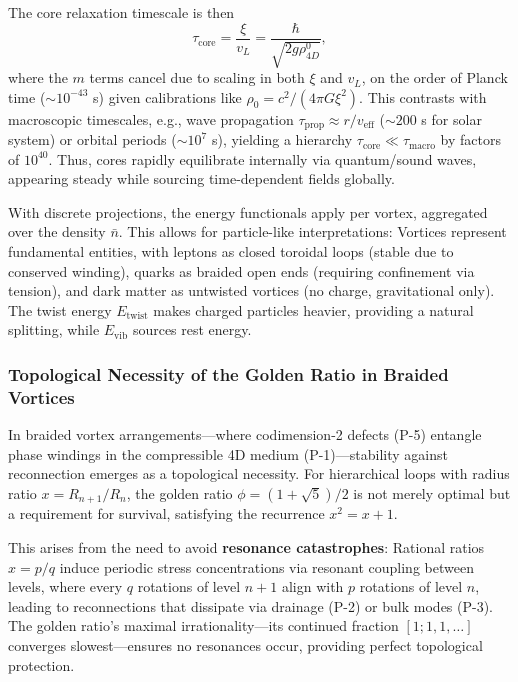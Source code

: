 The core relaxation timescale is then
\begin{equation}
\tau_{\text{core}} = \frac{\xi}{v_L} = \frac{\hbar}{\sqrt{2 g \rho_{4D}^0}},
\end{equation}
where the $m$ terms cancel due to scaling in both $\xi$ and $v_L$, on the order of Planck time ($\sim 10^{-43}$ s) given calibrations like $\rho_0 = c^2 / (4\pi G \xi^2)$. This contrasts with macroscopic timescales, e.g., wave propagation $\tau_{\text{prop}} \approx r / v_{\text{eff}}$ ($\sim 200$ s for solar system) or orbital periods ($\sim 10^7$ s), yielding a hierarchy $\tau_{\text{core}} \ll \tau_{\text{macro}}$ by factors of $10^{40}$. Thus, cores rapidly equilibrate internally via quantum/sound waves, appearing steady while sourcing time-dependent fields globally.

With discrete projections, the energy functionals apply per vortex, aggregated over the density $\bar{n}$. This allows for particle-like interpretations: Vortices represent fundamental entities, with leptons as closed toroidal loops (stable due to conserved winding), quarks as braided open ends (requiring confinement via tension), and dark matter as untwisted vortices (no charge, gravitational only). The twist energy $E_{\text{twist}}$ makes charged particles heavier, providing a natural splitting, while $E_{\text{vib}}$ sources rest energy.

\subsubsection{Topological Necessity of the Golden Ratio in Braided Vortices}

In braided vortex arrangements---where codimension-2 defects (P-5) entangle phase windings in the compressible 4D medium (P-1)---stability against reconnection emerges as a topological necessity. For hierarchical loops with radius ratio $x = R_{n+1}/R_n$, the golden ratio $\phi = (1 + \sqrt{5})/2$ is not merely optimal but a requirement for survival, satisfying the recurrence $x^2 = x + 1$.

This arises from the need to avoid \textbf{resonance catastrophes}: Rational ratios $x = p/q$ induce periodic stress concentrations via resonant coupling between levels, where every $q$ rotations of level $n+1$ align with $p$ rotations of level $n$, leading to reconnections that dissipate via drainage (P-2) or bulk modes (P-3). The golden ratio's maximal irrationality---its continued fraction $[1; 1, 1, \ldots]$ converges slowest---ensures no resonances occur, providing perfect topological protection.

